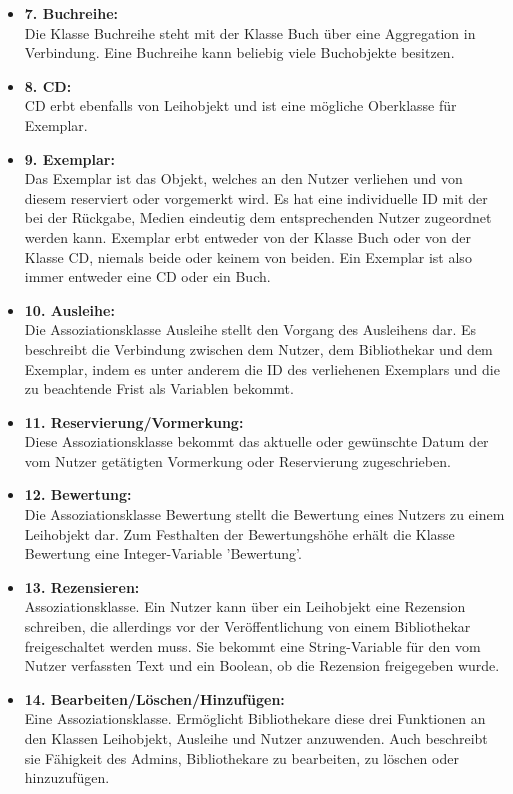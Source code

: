 \documentclass[fontsize=12pt,paper=a4,twoside]{scrartcl}
\begin{document}
\begin{itemize}
\item \textbf{7. Buchreihe:}\\
Die Klasse Buchreihe steht mit der Klasse Buch über eine Aggregation in Verbindung.
Eine Buchreihe kann beliebig viele Buchobjekte besitzen.
 
\item \textbf{8. CD:}\\
CD erbt ebenfalls von Leihobjekt und ist eine mögliche Oberklasse für Exemplar.

\item \textbf{9. Exemplar:}\\
Das Exemplar ist das Objekt, welches an den Nutzer verliehen und von diesem reserviert oder vorgemerkt wird. Es hat eine individuelle ID mit der bei der Rückgabe, Medien
eindeutig dem entsprechenden Nutzer zugeordnet werden kann. Exemplar erbt entweder von
der Klasse Buch oder von der Klasse CD, niemals beide oder keinem von beiden. Ein Exemplar ist also immer entweder eine CD oder ein Buch.

\item \textbf{10. Ausleihe:}\\
Die Assoziationsklasse Ausleihe stellt den Vorgang des Ausleihens dar.
Es beschreibt die Verbindung zwischen dem Nutzer, dem Bibliothekar und dem Exemplar, indem es unter anderem die ID des verliehenen Exemplars und die zu beachtende Frist 
als Variablen bekommt. 


\item \textbf{11. Reservierung/Vormerkung:}\\
Diese Assoziationsklasse bekommt das aktuelle oder gewünschte Datum der vom Nutzer getätigten Vormerkung oder Reservierung zugeschrieben.

\item \textbf{12. Bewertung:}\\
Die Assoziationsklasse Bewertung stellt die Bewertung eines Nutzers zu einem Leihobjekt dar. Zum Festhalten der Bewertungshöhe erhält die Klasse Bewertung
eine Integer-Variable 'Bewertung'.

\item \textbf{13. Rezensieren:}\\
Assoziationsklasse. Ein Nutzer kann über ein Leihobjekt eine Rezension schreiben, die allerdings vor der Veröffentlichung von einem Bibliothekar freigeschaltet werden muss. Sie bekommt eine String-Variable für den vom Nutzer verfassten Text und ein Boolean, ob die Rezension freigegeben wurde.

\item \textbf{14. Bearbeiten/Löschen/Hinzufügen:}\\
Eine Assoziationsklasse. Ermöglicht Bibliothekare diese drei Funktionen an den Klassen 
Leihobjekt, Ausleihe und Nutzer anzuwenden. Auch beschreibt sie Fähigkeit des Admins,
Bibliothekare zu bearbeiten, zu löschen oder hinzuzufügen.
\end{itemize}
 
\end{document}
